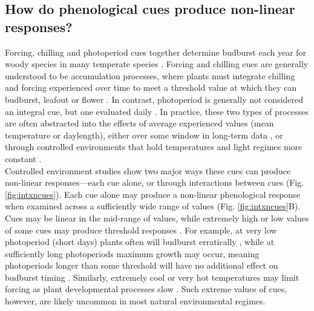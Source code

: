 \documentclass[11pt,letter]{article}
\begin{document}
\subsection{How do phenological cues produce non-linear responses?}
Forcing, chilling and photoperiod cues together determine budburst each year for woody species in many temperate species \citep[e.g.,][]{chuinearees,ettinger2020}. Forcing and chilling cues are generally understood to be accumulation processes, where plants must integrate chilling and forcing experienced over time to meet a threshold value at which they can budburst, leafout or flower \citep{Chuine2000}. In contrast, photoperiod is generally not considered an integral cue, but one evaluated daily \citep{Singh:2017}. In practice, these two types of processes are often abstracted into the effects of average experienced values (mean temperature or daylength), either over some window in long-term data \citep[e.g.,][]{Wolkovich:2012n,fu2015}, or through controlled environments that hold temperatures and light regimes more constant \citep[e.g.,][]{Worrall:1967aa,Heide:1993,Heide:1993a,Skuterud:1994aa}. \\

Controlled environment studies show two major ways these cues can produce non-linear responses---each cue alone, or through interactions between cues (Fig. \ref{fig:intxncues}). Each cue alone may produce a non-linear phenological response when examined across a sufficiently wide range of values (Fig. \ref{fig:intxncues}B). Cues may be linear in the mid-range of values, while extremely high or low values of some cues may produce threshold responses \citep{gauzere2017}. For example, at very low photoperiod (short days) plants often will budburst erratically \citep{Heide:1993,Partanen:1998aa,Singh:2017,rinne2018}, while at sufficiently long photoperiods maximum growth may occur, meaning photoperiods longer than some threshold will have no additional effect on budburst timing \citep[e.g.,][]{major1980}. Similarly, extremely cool or very hot temperatures may limit forcing as plant developmental processes slow \citep{parent2012}. Such extreme values of cues, however, are likely uncommon in most natural environmental regimes. %
\end{document}
